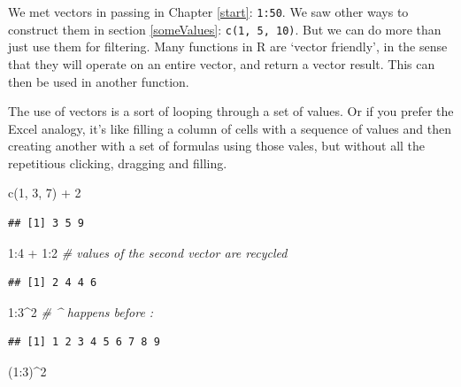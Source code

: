 \documentclass[
]{book}
\newenvironment{Shaded}{\begin{snugshade}}{\end{snugshade}}
\newcommand{\CommentTok}[1]{\textcolor[rgb]{0.56,0.35,0.01}{\textit{#1}}}
\newcommand{\DecValTok}[1]{\textcolor[rgb]{0.00,0.00,0.81}{#1}}
\newcommand{\FunctionTok}[1]{\textcolor[rgb]{0.00,0.00,0.00}{#1}}
\newcommand{\NormalTok}[1]{#1}
\newcommand{\SpecialCharTok}[1]{\textcolor[rgb]{0.00,0.00,0.00}{#1}}
\begin{document}
We met vectors in passing in Chapter \ref{start}: \texttt{1:50}. We saw other ways to construct them in section \ref{someValues}: \texttt{c(1,\ 5,\ 10)}. But we can do more than just use them for filtering. Many functions in R are `vector friendly', in the sense that they will operate on an entire vector, and return a vector result. This can then be used in another function.

The use of vectors is a sort of looping through a set of values. Or if you prefer the Excel analogy, it's like filling a column of cells with a sequence of values and then creating another with a set of formulas using those vales, but without all the repetitious clicking, dragging and filling.

\begin{Shaded}
\begin{Highlighting}[]
\FunctionTok{c}\NormalTok{(}\DecValTok{1}\NormalTok{, }\DecValTok{3}\NormalTok{, }\DecValTok{7}\NormalTok{) }\SpecialCharTok{+} \DecValTok{2}
\end{Highlighting}
\end{Shaded}

\begin{verbatim}
## [1] 3 5 9
\end{verbatim}

\begin{Shaded}
\begin{Highlighting}[]
\DecValTok{1}\SpecialCharTok{:}\DecValTok{4} \SpecialCharTok{+} \DecValTok{1}\SpecialCharTok{:}\DecValTok{2} \CommentTok{\# values of the second vector are recycled}
\end{Highlighting}
\end{Shaded}

\begin{verbatim}
## [1] 2 4 4 6
\end{verbatim}

\begin{Shaded}
\begin{Highlighting}[]
\DecValTok{1}\SpecialCharTok{:}\DecValTok{3}\SpecialCharTok{\^{}}\DecValTok{2} \CommentTok{\# \^{} happens before :}
\end{Highlighting}
\end{Shaded}

\begin{verbatim}
## [1] 1 2 3 4 5 6 7 8 9
\end{verbatim}

\begin{Shaded}
\begin{Highlighting}[]
\NormalTok{(}\DecValTok{1}\SpecialCharTok{:}\DecValTok{3}\NormalTok{)}\SpecialCharTok{\^{}}\DecValTok{2}
\end{Highlighting}
\end{Shaded}
\end{document}

